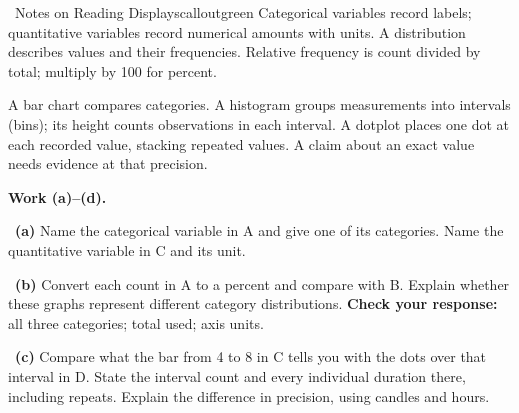 \documentclass[11pt]{article}
\begin{document}
\begin{callout}{\IconBook\ Notes on Reading Displays}{calloutgreen}
Categorical variables record labels; quantitative variables record numerical amounts with units. A distribution describes values and their frequencies. Relative frequency is count divided by total; multiply by 100 for percent.\par A bar chart compares categories. A histogram groups measurements into intervals (bins); its height counts observations in each interval. A dotplot places one dot at each recorded value, stacking repeated values. A claim about an exact value needs evidence at that precision.
\end{callout}

\newpage
\setlength{\parskip}{4pt}
\textbf{Work (a)--(d).}\par\smallskip

~\textbf{(a)} Name the categorical variable in A and give one of its categories. Name the quantitative variable in C and its unit.\par
{}

~\textbf{(b)} Convert each count in A to a percent and compare with B. Explain whether these graphs represent different category distributions. \textbf{Check your response:} \fbox{\rule{0pt}{0.65em}\hspace{0.65em}} all three categories; \fbox{\rule{0pt}{0.65em}\hspace{0.65em}} total used; \fbox{\rule{0pt}{0.65em}\hspace{0.65em}} axis units.\par
{}

~\textbf{(c)} Compare what the bar from 4 to 8 in C tells you with the dots over that interval in D. State the interval count and every individual duration there, including repeats. Explain the difference in precision, using candles and hours.\par
{}
\end{document}
